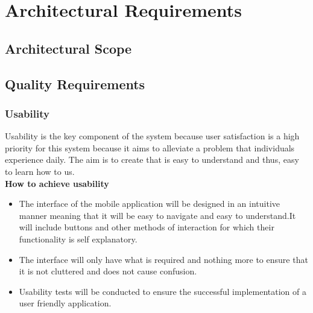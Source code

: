 \documentclass[a4paper,12pt]{article}
\begin{document}
\section{Architectural Requirements}
\subsection{Architectural Scope}

\subsection{Quality Requirements}
\subsubsection{Usability}
Usability is the key component of the system because user satisfaction is a high priority for this system because it aims to alleviate a problem that individuals experience daily. The aim is to create that is easy to understand and thus, easy to learn how to us. \\
\textbf{How to achieve usability}
\begin{itemize}
\item The interface of the mobile application will be designed in an intuitive manner meaning that it will be easy to navigate and easy to understand.It will include buttons and other methods of interaction for which their functionality is self explanatory.
\item The interface will only have what is required and nothing more to ensure that it is not cluttered and does not cause confusion.
\item Usability tests will be conducted to ensure the successful implementation of a user friendly application.
\end{itemize}
\end{document}
